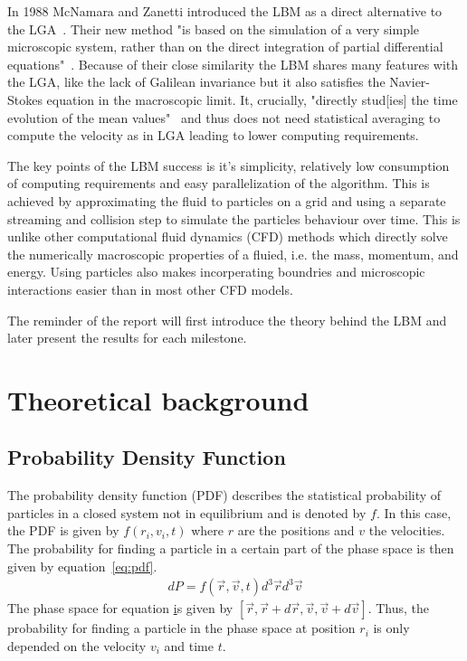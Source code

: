 \documentclass[a4paper,11pt]{article}
\begin{document}
In 1988 McNamara and Zanetti introduced the LBM as a direct alternative to the LGA~\cite{mcnamara1988boltzmann-method}.
Their new method "is based on the simulation of a very simple microscopic system, rather than on the direct integration of partial differential equations"~\cite{mcnamara1988boltzmann-method}.
Because of their close similarity the LBM shares many features with the LGA, like the lack of Galilean invariance but it also satisfies the Navier-Stokes equation in the macroscopic limit.
It, crucially, "directly stud[ies] the time evolution of the mean values"~\cite{mcnamara1988boltzmann-method} and thus does not need statistical averaging to compute the velocity as in LGA leading to lower computing requirements.

The key points of the LBM success is it's simplicity, relatively low consumption of computing requirements and easy parallelization of the algorithm.
This is achieved by approximating the fluid to particles on a grid and using a separate streaming and collision step to simulate the particles behaviour over time.
This is unlike other computational fluid dynamics (CFD) methods which directly solve the numerically macroscopic properties of a fluied, i.e. the mass, momentum, and energy.
Using particles also makes incorperating boundries and microscopic interactions easier than in most other CFD models.

The reminder of the report will first introduce the theory behind the LBM and later present the results for each milestone.

\section{Theoretical background}
\subsection{Probability Density Function}
The probability density function (PDF) describes the statistical probability of particles in a closed system not in equilibrium and is denoted by $f$.
In this case, the PDF is given by $f(r_i,v_i,t)$ where $r$ are the positions and $v$ the velocities.
The probability for finding a particle in a certain part of the phase space is then given by equation~\ref{eq:pdf}.
\begin{equation}
  \label{eq:pdf}
  \begin{aligned}
    dP = f(\vec{r},\vec{v},t) d^{3}\vec{r} d^{3}\vec{v}
  \end{aligned}
\end{equation}
The phase space for equation \href{eq:pdf} is given by $[\vec{r}, \vec{r}+d\vec{r}, \vec{v}, \vec{v}+d\vec{v}]$.
Thus, the probability for finding a particle in the phase space at position $r_i$ is only depended on the velocity $v_i$ and time $t$.
\end{document}
